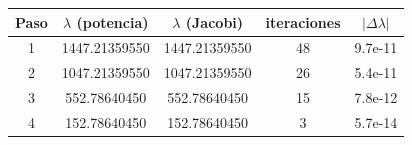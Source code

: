 \begin{tabular}{c c c c c}
\toprule
 Paso & $\lambda$ (potencia) & $\lambda$ (Jacobi) & iteraciones & $|\Delta\lambda|$\\
\midrule
1 & 1447.21359550 & 1447.21359550 & 48 & 9.7e-11\\
2 & 1047.21359550 & 1047.21359550 & 26 & 5.4e-11\\
3 & 552.78640450 & 552.78640450 & 15 & 7.8e-12\\
4 & 152.78640450 & 152.78640450 & 3 & 5.7e-14\\
\bottomrule
\end{tabular}

